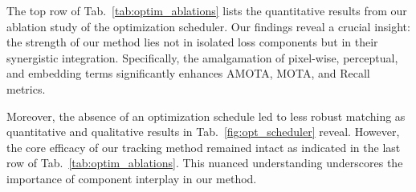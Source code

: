 The top row of Tab.~\ref{tab:optim_ablations} lists the quantitative results from our ablation study of the optimization scheduler. Our findings reveal a crucial insight: the strength of our method lies not in isolated loss components but in their synergistic integration. Specifically, the amalgamation of pixel-wise, perceptual, and embedding terms significantly enhances AMOTA, MOTA, and Recall metrics. 


Moreover, the absence of an optimization schedule led to less robust matching as quantitative and qualitative results in Tab.~\ref{fig:opt_scheduler} reveal.  However, the core efficacy of our tracking method remained intact as indicated in the last row of Tab.~\ref{tab:optim_ablations}. This nuanced understanding underscores the importance of component interplay in our method. 


% 













%
